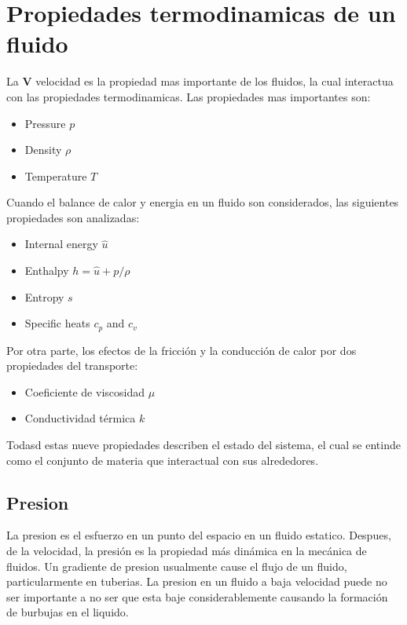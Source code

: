 \documentclass[10pt, oneside]{article}
\begin{document}
%
%

\section{Propiedades termodinamicas de un fluido}
La $\mathbf{V}$ velocidad es la propiedad mas importante de los fluidos, la cual interactua con las propiedades  termodinamicas. Las propiedades mas importantes son:
\begin{itemize}
\item Pressure $p$
\item Density $\rho$
\item Temperature $T$
\end{itemize}

Cuando el balance de calor y energia en un fluido son considerados, las siguientes propiedades son analizadas:
\begin{itemize}
\item Internal energy $\hat{u}$
\item Enthalpy $h=\hat{u}+p/\rho$
\item Entropy $s$
\item Specific heats $c_p$ and $c_v$
\end{itemize}

Por otra parte, los efectos de la fricci\'on y la conducci\'on de calor por dos propiedades del transporte:
\begin{itemize}
\item Coeficiente de viscosidad $\mu$
\item Conductividad t\'ermica $k$
\end{itemize}

Todasd estas nueve propiedades describen el estado del sistema, el cual se entinde como el conjunto de materia que interactual con sus alrededores.

\subsection{Presion}
La presion es el esfuerzo en un punto del espacio en un fluido estatico. Despues, de la velocidad, la presi\'on es la propiedad m\'as din\'amica en la mec\'anica de fluidos. Un gradiente de presion usualmente cause el flujo de un fluido, particularmente en tuberias. La presion en un fluido a baja velocidad puede no ser importante a no ser que esta baje considerablemente causando la formaci\'on de burbujas en el liquido. 
\end{document}
